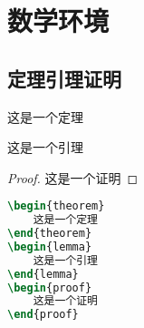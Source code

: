 \section{数学环境}
\subsection{定理引理证明}
\begin{theorem}
这是一个定理
\end{theorem}
\begin{lemma}
这是一个引理
\end{lemma}
\begin{proof}
这是一个证明
\end{proof}
\begin{lstlisting}[language=TeX]
\begin{theorem}
	这是一个定理
\end{theorem}
\begin{lemma}
	这是一个引理
\end{lemma}
\begin{proof}
	这是一个证明
\end{proof}
\end{lstlisting}

